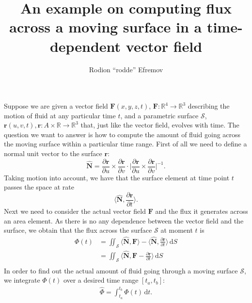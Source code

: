 \documentclass[12pt]{article}
\title{An example on computing flux across a moving surface in a time-dependent vector field}
\author{Rodion ``rodde'' Efremov}
\newcommand{\F}{\mathbf{F}}
\newcommand{\FF}{\hat{\Phi}}
\newcommand{\surf}{\mathbf{r}}
\newcommand{\N}{\hat{\mathbf{N}}}
\newcommand{\R}{\mathbb{R}}
\newcommand{\dr}{\partial \surf}
\newcommand{\du}{\partial u}
\newcommand{\dv}{\partial v}
\newcommand{\dt}{\partial t}
\newcommand{\dru}{\frac{\dr}{\du}}
\newcommand{\drv}{\frac{\dr}{\dv}}
\newcommand{\drt}{\frac{\dr}{\dt}}
\newcommand{\dS}{\,\mathrm{d}S}
\newcommand{\ddt}{\,\mathrm{d}t}
\begin{document}
 \maketitle

\noindent Suppose we are given a vector field $\F(x, y, z, t), \, \F \colon \R^4 \to \R^3$ describing the motion of fluid at any particular time $t$, and a parametric surface $\mathscr{S}$, $\surf (u, v, t), \surf \colon A \times \R \to \R^3$ that, just like the vector field, evolves with time. The question we want to answer is how to compute the amount of fluid going across the moving surface within a particular time range. First of all we need to define a normal unit vector to the surface $\surf$:
\[
\N = \dru \times \drv \cdot \Big| \dru \times \drv \Big|^{-1}.
\]
Taking motion into account, we have that the surface element at time point $t$ passes the space at rate 
\[
\langle \N , \drt \rangle.
\]
Next we need to consider the actual vector field $\F$ and the flux it generates across an area element. As there is no any dependence between the vector field and the surface, we obtain that the flux across the surface $\mathscr{S}$ at moment $t$ is
\begin{align*}
\Phi(t) &= \iint_{\mathscr{S}} \langle \N, \F \rangle - \langle \N , \drt \rangle \dS \\
		   &= \iint_{\mathscr{S}} \langle \N , \F - \drt \rangle \dS \\
\end{align*}
In order to find out the actual amount of fluid going through a moving surface $\mathscr{S}$, we integrate $\Phi(t)$ over a desired time range $\left[ t_a, t_b \right]$:
\begin{align*}
\FF = \int_{t_a}^{t_b} \Phi(t) \ddt.
\end{align*}
\end{document}
